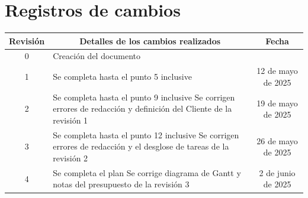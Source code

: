 \documentclass[
11pt, %
]{charter}
\begin{document}
\maketitle
\thispagestyle{empty}
\pagebreak


\thispagestyle{empty}
{\setlength{\parskip}{0pt}
\tableofcontents{}
}
\pagebreak


\section*{Registros de cambios}
\label{sec:registro}


\begin{table}[ht]
\label{tab:registro}
\centering
\begin{tabularx}{\linewidth}{@{}|c|X|c|@{}}
\hline
\rowcolor[HTML]{C0C0C0} 
Revisión & \multicolumn{1}{c|}{\cellcolor[HTML]{C0C0C0}Detalles de los cambios realizados} & Fecha	\\ \hline
0      & Creación del documento                                 &\fechaInicioName					\\ \hline
1      & Se completa hasta el punto 5 inclusive                 & {12} de {mayo} de 2025			\\ \hline
2      & Se completa hasta el punto 9 inclusive \newline Se corrigen errores de redacción y definición del Cliente de la revisión 1	& {19} de {mayo} de 2025			\\ \hline
3      & Se completa hasta el punto 12 inclusive \newline Se corrigen errores de redacción y el desglose de tareas de la revisión 2	& {26} de {mayo} de 2025			\\ \hline
4      & Se completa el plan \newline Se corrige diagrama de Gantt y notas del presupuesto de la revisión 3	& {2} de {junio} de 2025			\\ \hline


\end{tabularx}
\end{table}
\end{document}
